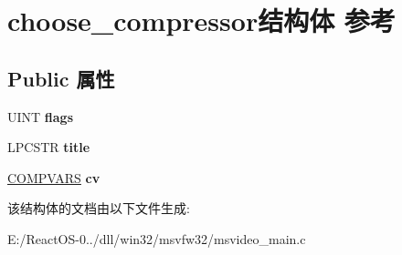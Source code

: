 \hypertarget{structchoose__compressor}{}\section{choose\+\_\+compressor结构体 参考}
\label{structchoose__compressor}
\subsection*{Public 属性}
\begin{DoxyCompactItemize}
\item 
\mbox{\label{structchoose__compressor_afae186147f1dffead45966e406393230}} 
U\+I\+NT {\bfseries flags}
\item 
\mbox{\label{structchoose__compressor_a3351db733048fae90c0011272fad71bc}} 
L\+P\+C\+S\+TR {\bfseries title}
\item 
\mbox{\label{structchoose__compressor_a27441d8765564f43bd990055753ba2a6}} 
\hyperlink{struct_c_o_m_p_v_a_r_s}{C\+O\+M\+P\+V\+A\+RS} {\bfseries cv}
\end{DoxyCompactItemize}


该结构体的文档由以下文件生成\+:\begin{DoxyCompactItemize}
\item 
E\+:/\+React\+O\+S-\/0../dll/win32/msvfw32/msvideo\+\_\+main.\+c\end{DoxyCompactItemize}
